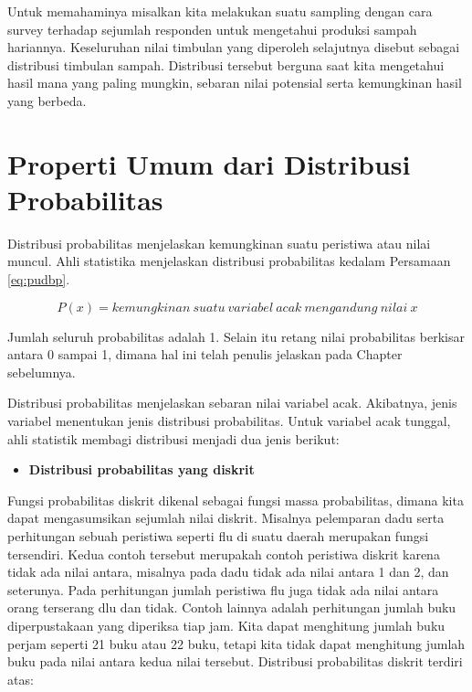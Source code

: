 \documentclass[]{book}
\providecommand{\tightlist}{%
  \setlength{\itemsep}{0pt}\setlength{\parskip}{0pt}}
\begin{document}
Untuk memahaminya misalkan kita melakukan suatu sampling dengan cara
survey terhadap sejumlah responden untuk mengetahui produksi sampah
hariannya. Keseluruhan nilai timbulan yang diperoleh selajutnya disebut
sebagai distribusi timbulan sampah. Distribusi tersebut berguna saat
kita mengetahui hasil mana yang paling mungkin, sebaran nilai potensial
serta kemungkinan hasil yang berbeda.

\section{Properti Umum dari Distribusi
Probabilitas}\label{properti-umum-dari-distribusi-probabilitas}

Distribusi probabilitas menjelaskan kemungkinan suatu peristiwa atau
nilai muncul. Ahli statistika menjelaskan distribusi probabilitas
kedalam Persamaan \eqref{eq:pudbp}.

\begin{equation}
   P\left(x\right)=kemungkinan\ suatu\ variabel\ acak\ mengandung\ nilai\ x
  \label{eq:pudbp}
\end{equation}

Jumlah seluruh probabilitas adalah 1. Selain itu retang nilai
probabilitas berkisar antara 0 sampai 1, dimana hal ini telah penulis
jelaskan pada Chapter sebelumnya.

Distribusi probabilitas menjelaskan sebaran nilai variabel acak.
Akibatnya, jenis variabel menentukan jenis distribusi probabilitas.
Untuk variabel acak tunggal, ahli statistik membagi distribusi menjadi
dua jenis berikut:

\begin{itemize}
\tightlist
\item
  \textbf{Distribusi probabilitas yang diskrit}
\end{itemize}

Fungsi probabilitas diskrit dikenal sebagai fungsi massa probabilitas,
dimana kita dapat mengasumsikan sejumlah nilai diskrit. Misalnya
pelemparan dadu serta perhitungan sebuah peristiwa seperti flu di suatu
daerah merupakan fungsi tersendiri. Kedua contoh tersebut merupakah
contoh peristiwa diskrit karena tidak ada nilai antara, misalnya pada
dadu tidak ada nilai antara 1 dan 2, dan seterunya. Pada perhitungan
jumlah peristiwa flu juga tidak ada nilai antara orang terserang dlu dan
tidak. Contoh lainnya adalah perhitungan jumlah buku diperpustakaan yang
diperiksa tiap jam. Kita dapat menghitung jumlah buku perjam seperti 21
buku atau 22 buku, tetapi kita tidak dapat menghitung jumlah buku pada
nilai antara kedua nilai tersebut. Distribusi probabilitas diskrit
terdiri atas:
\end{document}
